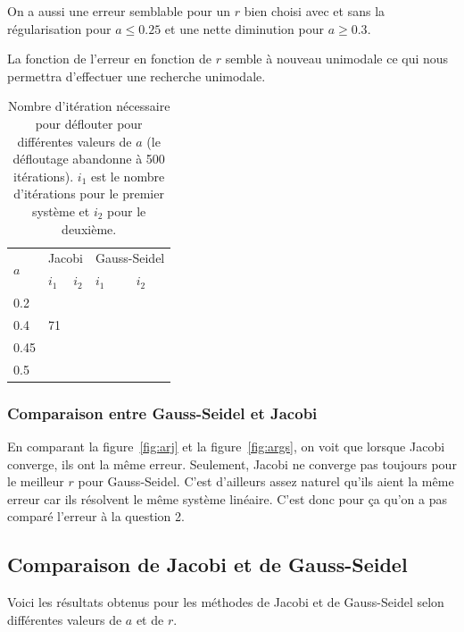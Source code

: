 On a aussi une erreur semblable pour un $r$ bien choisi
avec et sans la régularisation pour $a \leq 0.25$ et une nette
diminution pour $a \geq 0.3$.

La fonction de l'erreur en fonction de $r$ semble à nouveau unimodale
ce qui nous permettra d'effectuer une recherche unimodale.

\begin{table}
  \centering
  \begin{tabular}{|l|l|l|l|l|}
    \hline
    \multirow{2}{*}{$a$} & \multicolumn{2}{l|}{Jacobi} & \multicolumn{2}{l|}{Gauss-Seidel}\\
    \cline{2-5}
        & $i_1$ & $i_2$ & $i_1$ & $i_2$\\
    \hline
    0.2 &     &     &     & \\
    \hline
    0.4 & 71    &     &     & \\
    \hline
    0.45&   &    &     & \\
    \hline
    0.5 &    &   &    & \\
    \hline
  \end{tabular}
  \caption{Nombre d'itération nécessaire pour déflouter pour différentes valeurs de $a$ (le défloutage abandonne à 500 itérations).
  $i_1$ est le nombre d'itérations pour le premier système et $i_2$ pour le deuxième.}
  \label{tab:iter}
\end{table}

\subsubsection{Comparaison entre Gauss-Seidel et Jacobi}
En comparant la figure~\ref{fig:arj} et la figure~\ref{fig:args}, on voit
que lorsque Jacobi converge, ils ont la même erreur.
Seulement, Jacobi ne converge pas toujours pour le meilleur $r$ pour Gauss-Seidel.
C'est d'ailleurs assez naturel qu'ils aient la même erreur car ils résolvent le même
système linéaire.
C'est donc pour ça qu'on a pas comparé l'erreur à la question 2.

\subsection{Comparaison de Jacobi et de Gauss-Seidel}

Voici les résultats obtenus pour les méthodes de Jacobi et de Gauss-Seidel selon différentes valeurs de $a$ et de $r$.

